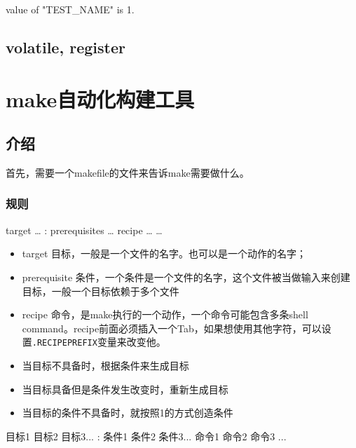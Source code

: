 \begin{Command-Line}[运行结果]
value of "TEST_NAME" is 1.
\end{Command-Line}

\subsection{volatile, register}


\section{make自动化构建工具}


\subsection{介绍}

首先，需要一个makefile的文件来告诉make需要做什么。

\subsubsection{规则}

\begin{Bash}[一条规则长这样]
target … : prerequisites …
	recipe
	…
	…
\end{Bash}

\begin{itemize}
\item target 目标，一般是一个文件的名字。也可以是一个动作的名字；
\item prerequisite 条件，一个条件是一个文件的名字，这个文件被当做输入来创建目标，一般一个目标依赖于多个文件
\item recipe 命令，是make执行的一个动作，一个命令可能包含多条shell command。recipe前面必须插入一个Tab，如果想使用其他字符，可以设置\lstinline$.RECIPEPREFIX$变量来改变他。
\end{itemize}



\begin{itemize}
\item 当目标不具备时，根据条件来生成目标
\item 当目标具备但是条件发生改变时，重新生成目标
\item 当目标的条件不具备时，就按照1的方式创造条件
\end{itemize}

\begin{Command-Line}
目标1 目标2 目标3... : 条件1 条件2 条件3...
	命令1
	命令2
	命令3
...
\end{Command-Line}

